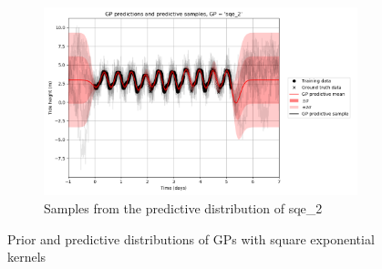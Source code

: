\documentclass{article}
\begin{document}
\begin{figure}[pht]
\begin{subfigure}{0.45\textwidth}
        \includegraphics[width=\textwidth]{GP_predictions_and_predictive_samples,_GP____sqe_2_.png}
        \caption{Samples from the predictive distribution of sqe\_2}
        \label{fig:pred_samples_sqe_2}
    \end{subfigure}

    \caption{Prior and predictive distributions of GPs with square exponential kernels}
    \label{fig:sqe}
\end{figure}
\end{document}
